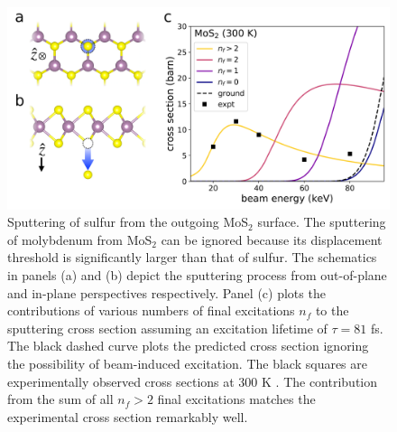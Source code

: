 \documentclass{article}
\begin{document}
\begin{figure}
  \centering
  \includegraphics[width=.95\textwidth]{fig6.pdf}
  \caption{
    Sputtering of sulfur from the outgoing MoS$_2$ surface.
    The sputtering of molybdenum from MoS$_2$ can be ignored because its
    displacement threshold is significantly larger than that of sulfur.
    The schematics in panels (a) and (b) depict the sputtering process from
    out-of-plane and in-plane perspectives respectively.
    Panel (c) plots the contributions of various numbers of final excitations
    $n_f$ to the sputtering cross section assuming an excitation lifetime of
    $\tau=81$ fs.
    The black dashed curve plots the predicted cross section ignoring the
    possibility of beam-induced excitation.
    The black squares are experimentally observed cross sections at 300 K
    \cite{Kretschmer2020}.
    The contribution from the sum of all $n_f>2$ final excitations matches
    the experimental cross section remarkably well.
  }
  \label{fig:MoS2Cross}
\end{figure}
\end{document}
